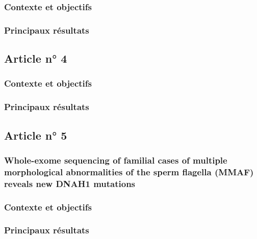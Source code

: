 \documentclass[12pt,twoside]{ugathesis}
\begin{document}
\subsubsection{Contexte et objectifs}\label{contexte-et-objectifs}

\subsubsection{Principaux résultats}\label{principaux-resultats}

\subsection{Article n° 4}\label{article-n-4}

\subsubsection{Contexte et objectifs}\label{contexte-et-objectifs-1}

\subsubsection{Principaux résultats}\label{principaux-resultats-1}

\subsection{Article n° 5}\label{article-n-5}

\subsubsection{Whole-exome sequencing of familial cases of multiple
morphological abnormalities of the sperm flagella (MMAF) reveals new
DNAH1
mutations}\label{whole-exome-sequencing-of-familial-cases-of-multiple-morphological-abnormalities-of-the-sperm-flagella-mmaf-reveals-new-dnah1-mutations}

\subsubsection{Contexte et objectifs}\label{contexte-et-objectifs-2}

\subsubsection{Principaux résultats}\label{principaux-resultats-2}
\end{document}
